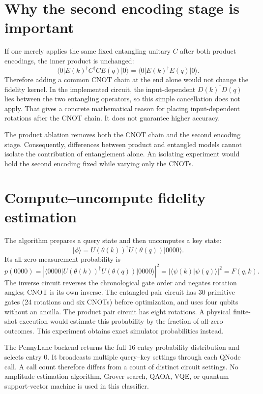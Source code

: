 \documentclass[11pt,a4paper]{report}
\newcommand{\ket}[1]{\lvert #1\rangle}
\newcommand{\bra}[1]{\langle #1\rvert}
\begin{document}
\section{Why the second encoding stage is important}
If one merely applies the same fixed entangling unitary $C$ after both product encodings, the inner product is unchanged:
\begin{equation}
\bra0 E(k)^\dagger C^\dagger C E(q)\ket0
=\bra0 E(k)^\dagger E(q)\ket0.
\end{equation}
Therefore adding a common CNOT chain at the end alone would not change the fidelity kernel. In the implemented circuit, the input-dependent $D(k)^\dagger D(q)$ lies between the two entangling operators, so this simple cancellation does not apply. That gives a concrete mathematical reason for placing input-dependent rotations after the CNOT chain. It does not guarantee higher accuracy.

The product ablation removes both the CNOT chain and the second encoding stage. Consequently, differences between product and entangled models cannot isolate the contribution of entanglement alone. An isolating experiment would hold the second encoding fixed while varying only the CNOTs.

\section{Compute--uncompute fidelity estimation}
The algorithm prepares a query state and then uncomputes a key state:
\begin{equation}
\ket{\phi}=U(\theta(k))^\dagger U(\theta(q))\ket{0000}.
\end{equation}
Its all-zero measurement probability is
\begin{equation}
p(0000)=\left|\bra{0000}U(\theta(k))^\dagger U(\theta(q))\ket{0000}\right|^2
=|\langle\psi(k)|\psi(q)\rangle|^2=F(q,k).
\end{equation}
The inverse circuit reverses the chronological gate order and negates rotation angles; CNOT is its own inverse. The entangled pair circuit has 30 primitive gates (24 rotations and six CNOTs) before optimization, and uses four qubits without an ancilla. The product pair circuit has eight rotations. A physical finite-shot execution would estimate this probability by the fraction of all-zero outcomes. This experiment obtains exact simulator probabilities instead.

The PennyLane backend returns the full 16-entry probability distribution and selects entry 0. It broadcasts multiple query--key settings through each QNode call. A call count therefore differs from a count of distinct circuit settings. No amplitude-estimation algorithm, Grover search, QAOA, VQE, or quantum support-vector machine is used in this classifier.
\end{document}

